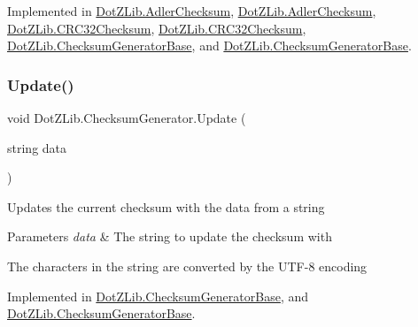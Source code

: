 Implemented in \hyperlink{class_dot_z_lib_1_1_adler_checksum_a757dd32613c477dcb7384b206b72fc34}{Dot\+Z\+Lib.\+Adler\+Checksum}, \hyperlink{class_dot_z_lib_1_1_adler_checksum_a757dd32613c477dcb7384b206b72fc34}{Dot\+Z\+Lib.\+Adler\+Checksum}, \hyperlink{class_dot_z_lib_1_1_c_r_c32_checksum_abe29e66033fa164a7c7c0463e6c88074}{Dot\+Z\+Lib.\+C\+R\+C32\+Checksum}, \hyperlink{class_dot_z_lib_1_1_c_r_c32_checksum_abe29e66033fa164a7c7c0463e6c88074}{Dot\+Z\+Lib.\+C\+R\+C32\+Checksum}, \hyperlink{class_dot_z_lib_1_1_checksum_generator_base_a7844da3e1f8af01d7cde34f3056bf24b}{Dot\+Z\+Lib.\+Checksum\+Generator\+Base}, and \hyperlink{class_dot_z_lib_1_1_checksum_generator_base_a7844da3e1f8af01d7cde34f3056bf24b}{Dot\+Z\+Lib.\+Checksum\+Generator\+Base}.

\mbox{\label{interface_dot_z_lib_1_1_checksum_generator_ac5a728d2dd56479b429648177607fd39}} 
\subsubsection{\texorpdfstring{Update()}{Update()}\hspace{0.1cm}{\footnotesize\ttfamily [5/8]}}
{\footnotesize\ttfamily void Dot\+Z\+Lib.\+Checksum\+Generator.\+Update (\begin{DoxyParamCaption}\item[{string}]{data }\end{DoxyParamCaption})}



Updates the current checksum with the data from a string 


\begin{DoxyParams}{Parameters}
{\em data} & The string to update the checksum with\\
\hline
\end{DoxyParams}


The characters in the string are converted by the U\+T\+F-\/8 encoding

Implemented in \hyperlink{class_dot_z_lib_1_1_checksum_generator_base_a4f0a5411dbb86714571852000932d66e}{Dot\+Z\+Lib.\+Checksum\+Generator\+Base}, and \hyperlink{class_dot_z_lib_1_1_checksum_generator_base_a4f0a5411dbb86714571852000932d66e}{Dot\+Z\+Lib.\+Checksum\+Generator\+Base}.

